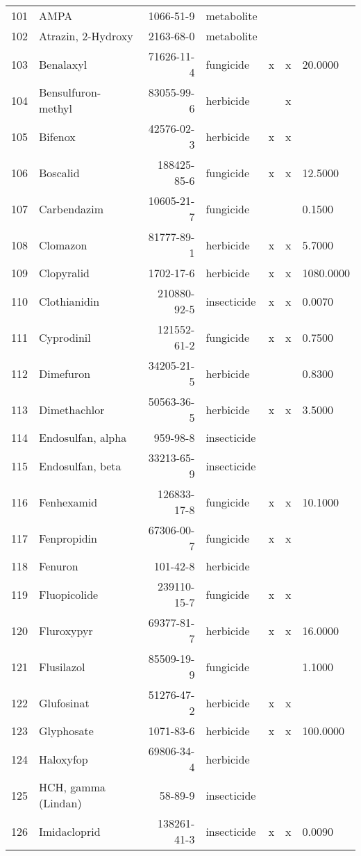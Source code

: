 \begin{longtable}{lp{3cm}rlp{0.5cm}p{0.5cm}p{1.5cm}}
  101 & AMPA & 1066-51-9 & metabolite &  &  &  \\ 
  102 & Atrazin, 2-Hydroxy & 2163-68-0 & metabolite &  &  &  \\ 
  103 & Benalaxyl & 71626-11-4 & fungicide & x & x & 20.0000 \\ 
  104 & Bensulfuron-methyl & 83055-99-6 & herbicide &  & x &  \\ 
  105 & Bifenox & 42576-02-3 & herbicide & x & x &  \\ 
  106 & Boscalid & 188425-85-6 & fungicide & x & x & 12.5000 \\ 
  107 & Carbendazim & 10605-21-7 & fungicide &  &  & 0.1500 \\ 
  108 & Clomazon & 81777-89-1 & herbicide & x & x & 5.7000 \\ 
  109 & Clopyralid & 1702-17-6 & herbicide & x & x & 1080.0000 \\ 
  110 & Clothianidin & 210880-92-5 & insecticide & x & x & 0.0070 \\ 
  111 & Cyprodinil & 121552-61-2 & fungicide & x & x & 0.7500 \\ 
  112 & Dimefuron & 34205-21-5 & herbicide &  &  & 0.8300 \\ 
  113 & Dimethachlor & 50563-36-5 & herbicide & x & x & 3.5000 \\ 
  114 & Endosulfan, alpha & 959-98-8 & insecticide &  &  &  \\ 
  115 & Endosulfan, beta & 33213-65-9 & insecticide &  &  &  \\ 
  116 & Fenhexamid & 126833-17-8 & fungicide & x & x & 10.1000 \\ 
  117 & Fenpropidin & 67306-00-7 & fungicide & x & x &  \\ 
  118 & Fenuron & 101-42-8 & herbicide &  &  &  \\ 
  119 & Fluopicolide & 239110-15-7 & fungicide & x & x &  \\ 
  120 & Fluroxypyr & 69377-81-7 & herbicide & x & x & 16.0000 \\ 
  121 & Flusilazol & 85509-19-9 & fungicide &  &  & 1.1000 \\ 
  122 & Glufosinat & 51276-47-2 & herbicide & x & x &  \\ 
  123 & Glyphosate & 1071-83-6 & herbicide & x & x & 100.0000 \\ 
  124 & Haloxyfop & 69806-34-4 & herbicide &  &  &  \\ 
  125 & HCH, gamma (Lindan) & 58-89-9 & insecticide &  &  &  \\ 
  126 & Imidacloprid & 138261-41-3 & insecticide & x & x & 0.0090 \\ 

\end{longtable}
